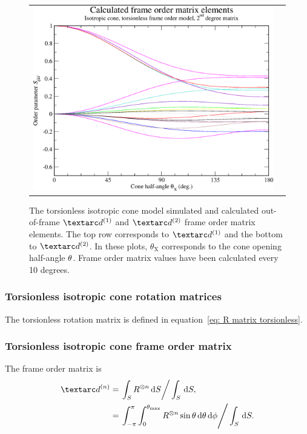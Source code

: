 \begin{figure}
\begin{tabular}{@{}cc@{}}
    \includegraphics[width=.5\textwidth]{images/frame_order_matrix/Sijkl_iso_cone_torsionless_out_of_frame_theta_x_calc.eps} \\
  \end{tabular}
  \caption[Torsionless isotropic cone simulated and calculated out-of-frame Daeg$^{(1)}$ and Daeg$^{(2)}$ elements.]{
    The torsionless isotropic cone model simulated and calculated out-of-frame $\FOone$ and $\FOtwo$ frame order matrix elements.
    The top row corresponds to $\FOone$ and the bottom to $\FOtwo$.
    In these plots, $\theta_\textrm{X}$ corresponds to the cone opening half-angle $\theta$.
    Frame order matrix values have been calculated every 10 degrees.
  }
  \label{fig: simulated and calculated out-of-frame 1st and 2nd degree iso cone, torsionless frame order}
\end{figure}


\subsubsection{Torsionless isotropic cone rotation matrices}

The torsionless rotation matrix is defined in equation~\ref{eq: R matrix torsionless}.


\subsubsection{Torsionless isotropic cone frame order matrix}

The frame order matrix is
\begin{subequations}
\begin{align}
    \FOn &= \left. \int_S R^{\otimes n} \diff S \right / \int_S \diff S , \\
         &= \left. \int_{-\pi}^{\pi} \int_{0}^{\conethetamax} R^{\otimes n} \sin\theta \diff\theta \diff\phi  \right / \int_S \diff S .
\end{align}
\end{subequations}

